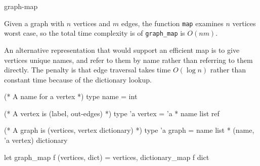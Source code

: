 \begin{exercise}{graph-map}
\begin{answer}
Given a graph with $n$ vertices and $m$ edges, the function \hbox{\lstinline/map/} examines $n$ vertices worst case, so the total time complexity is of \hbox{\lstinline/graph_map/} is $O(nm)$.

An alternative representation that would support an efficient map is to give vertices unique names,
and refer to them by name rather than referring to them directly.  The penalty is that edge
traversal takes time $O(\log n)$ rather than constant time because of the dictionary lookup.

\begin{ocaml}
(* A name for a vertex *)
type name = int

(* A vertex is (label, out-edges) *)
type 'a vertex = 'a * name list ref

(* A graph is (vertices, vertex dictionary) *)
type 'a graph = name list * (name, 'a vertex) dictionary

let graph_map f (vertices, dict) =
   vertices, dictionary_map f dict
\end{ocaml}
\fi\end{answer}
\end{exercise}

